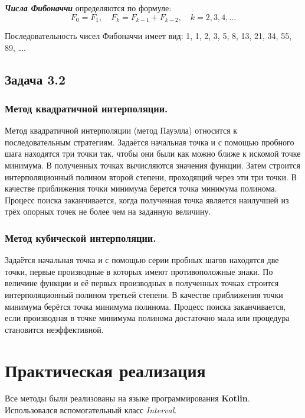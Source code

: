 \documentclass[a4paper, 12pt]{article}   	%
\begin{document}
    \textit{\textbf{Числа Фибоначчи}} определяются по формуле:
    \begin{equation}
        F_0 = F_1, \quad F_k = F_{k-1} + F_{k-2}, \quad k = 2,3,4,...
    \end{equation}
    
    Последовательность чисел Фибоначчи имеет вид: 1, 1, 2, 3, 5, 8, 13, 21, 34, 55, 89, ….
    
\subsection{Задача 3.2}

\subsubsection{Метод квадратичной интерполяции.}

    Метод квадратичной интерполяции (метод Пауэлла) относится к последовательным стратегиям. Задаётся начальная точка и с помощью пробного шага находятся три точки так, чтобы они были как можно ближе к искомой точке минимума. В полученных точках вычисляются значения функции. Затем строится интерполяционный полином второй степени, проходящий через эти три точки. В качестве приближения точки минимума берется точка минимума полинома. Процесс поиска заканчивается, когда полученная точка является наилучшей из трёх опорных точек не более чем на заданную величину.

\subsubsection{Метод кубической интерполяции.}

    Задаётся начальная точка и с помощью серии пробных шагов находятся две точки, первые производные в которых имеют противоположные знаки. По величине функции и её первых производных в полученных точках строится интерполяционный полином третьей степени. В качестве приближения точки минимума берётся точка минимума полинома.  Процесс поиска заканчивается, если производная в точке минимума полинома достаточно мала или процедура становится неэффективной.

\newpage

\section{Практическая реализация}

    Все методы были реализованы на языке программирования \textbf{Kotlin}. Использовался вспомогательный класс \textit{Interval}.
    
\end{document}
